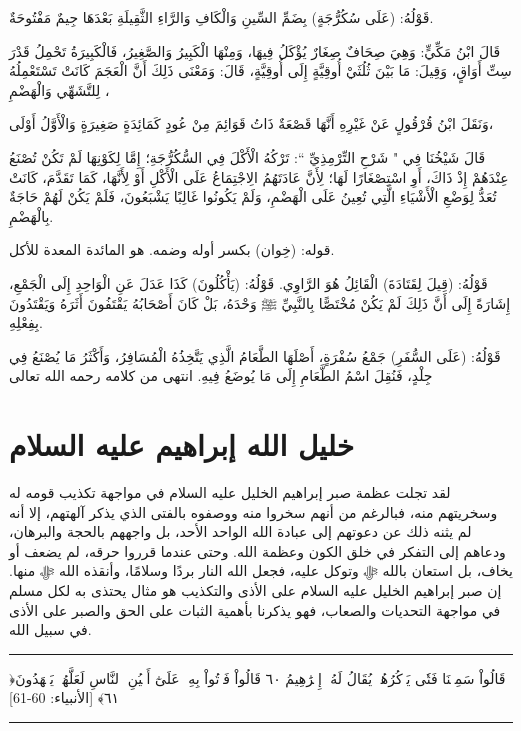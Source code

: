 \documentclass[12pt,openany]{book}
\newenvironment{quranblock}
  {\par\medskip\begin{center}\begin{minipage}{0.92\linewidth}\centering\quranfont\large\color{ink}\hrule\vspace{0.65em}}
  {\vspace{0.65em}\hrule\end{minipage}\end{center}\medskip}
\begin{document}
قَوْلُهُ: (عَلَى سُكُرُّجَةٍ) بِضَمِّ السِّينِ وَالْكَافِ وَالرَّاءِ الثَّقِيلَةِ بَعْدَهَا جِيمٌ مَفْتُوحَةٌ.

قَالَ ابْنُ مَكِّيٍّ: وَهِيَ صِحَافٌ صِغَارٌ يُؤْكَلُ فِيهَا، وَمِنْهَا الْكَبِيرُ وَالصَّغِيرُ، فَالْكَبِيرَةُ تَحْمِلُ قَدْرَ سِتِّ أَوَاقٍ، وَقِيلَ: مَا بَيْنَ ثُلُثَيْ أُوقِيَّةٍ إِلَى أُوقِيَّةٍ، قَالَ: وَمَعْنَى ذَلِكَ أَنَّ الْعَجَمَ كَانَتْ تَسْتَعْمِلُهُ لِلتَّشَهِّي وَالْهَضْمِ ،

وَنَقَلَ ابْنُ قُرْقُولٍ عَنْ غَيْرِهِ أَنَّهَا قَصْعَةٌ ذَاتُ قَوَائِمَ مِنْ عُودٍ كَمَائِدَةٍ صَغِيرَةٍ وَالْأَوَّلُ أَوْلَى،

قَالَ شَيْخُنَا فِي " شَرْحِ التِّرْمِذِيِّ “: تَرْكُهُ الْأَكْلَ فِي السُّكُرُّجَةِ؛ إِمَّا لِكَوْنِهَا لَمْ تَكُنْ تُصْنَعُ عِنْدَهُمْ إِذْ ذَاكَ، أَوِ اسْتِصْغَارًا لَهَا؛ لِأَنَّ عَادَتَهُمُ الِاجْتِمَاعُ عَلَى الْأَكْلِ أَوْ لِأَنَّهَا، كَمَا تَقَدَّمَ، كَانَتْ تُعَدُّ لِوَضْعِ الْأَشْيَاءِ الَّتِي تُعِينُ عَلَى الْهَضْمِ، وَلَمْ يَكُونُوا غَالِبًا يَشْبَعُونَ، فَلَمْ يَكُنْ لَهُمْ حَاجَةٌ بِالْهَضْمِ.

قوله: (خِوان) بكسر أوله وضمه. هو المائدة المعدة للأكل.

قَوْلُهُ: (قِيلَ لِقَتَادَةَ) الْقَائِلُ هُوَ الرَّاوِي. قَوْلُهُ: (يَأْكُلُونَ) كَذَا عَدَلَ عَنِ الْوَاحِدِ إِلَى الْجَمْعِ، إِشَارَةً إِلَى أَنَّ ذَلِكَ لَمْ يَكُنْ مُخْتَصًّا بِالنَّبِيِّ ﷺ وَحْدَهُ، بَلْ كَانَ أَصْحَابُهُ يَقْتَفُونَ أَثَرَهُ وَيَقْتَدُونَ بِفِعْلِهِ.

قَوْلُهُ: (عَلَى السُّفَرِ) جَمْعُ سُفْرَةٍ، أَصْلَهَا الطَّعَامُ الَّذِي يَتَّخِذُهُ الْمُسَافِرُ، وَأَكْثَرُ مَا يُصْنَعُ فِي جِلْدٍ، فَنُقِلَ اسْمُ الطَّعَامِ إِلَى مَا يُوضَعُ فِيهِ. انتهى من كلامه رحمه الله تعالى

\section{خليل الله إبراهيم عليه السلام}
لقد تجلت عظمة صبر إبراهيم الخليل عليه السلام في مواجهة تكذيب قومه له وسخريتهم منه، فبالرغم من أنهم سخروا منه ووصفوه بالفتى الذي يذكر آلهتهم، إلا أنه لم يثنه ذلك عن دعوتهم إلى عبادة الله الواحد الأحد، بل واجههم بالحجة والبرهان، ودعاهم إلى التفكر في خلق الكون وعظمة الله. وحتى عندما قرروا حرقه، لم يضعف أو يخاف، بل استعان بالله ﷻ وتوكل عليه، فجعل الله النار بردًا وسلامًا، وأنقذه الله ﷻ منها. إن صبر إبراهيم الخليل عليه السلام على الأذى والتكذيب هو مثال يحتذى به لكل مسلم في مواجهة التحديات والصعاب، فهو يذكرنا بأهمية الثبات على الحق والصبر على الأذى في سبيل الله.

\begin{quranblock}
﴿قَالُواْ سَمِعۡنَا ‌فَتٗى ‌يَذۡكُرُهُمۡ يُقَالُ لَهُۥٓ إِبۡرَٰهِيمُ ٦٠ قَالُواْ فَأۡتُواْ بِهِۦ عَلَىٰٓ أَعۡيُنِ ٱلنَّاسِ لَعَلَّهُمۡ يَشۡهَدُونَ ٦١﴾ [الأنبياء: 60-61]
\end{quranblock}
\end{document}
